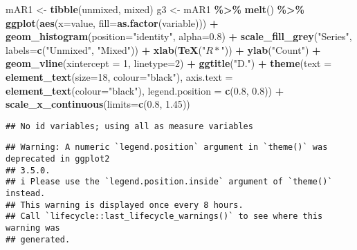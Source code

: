 \documentclass[
]{article}
\newenvironment{Shaded}{\begin{snugshade}}{\end{snugshade}}
\newcommand{\AttributeTok}[1]{\textcolor[rgb]{0.13,0.29,0.53}{#1}}
\newcommand{\DecValTok}[1]{\textcolor[rgb]{0.00,0.00,0.81}{#1}}
\newcommand{\FloatTok}[1]{\textcolor[rgb]{0.00,0.00,0.81}{#1}}
\newcommand{\FunctionTok}[1]{\textcolor[rgb]{0.13,0.29,0.53}{\textbf{#1}}}
\newcommand{\NormalTok}[1]{#1}
\newcommand{\OtherTok}[1]{\textcolor[rgb]{0.56,0.35,0.01}{#1}}
\newcommand{\SpecialCharTok}[1]{\textcolor[rgb]{0.81,0.36,0.00}{\textbf{#1}}}
\newcommand{\StringTok}[1]{\textcolor[rgb]{0.31,0.60,0.02}{#1}}
\begin{document}
\begin{Shaded}
\begin{Highlighting}[]
\NormalTok{mAR1 }\OtherTok{\textless{}{-}} \FunctionTok{tibble}\NormalTok{(unmixed, mixed)}
\NormalTok{g3 }\OtherTok{\textless{}{-}} 
\NormalTok{  mAR1 }\SpecialCharTok{\%\textgreater{}\%} 
  \FunctionTok{melt}\NormalTok{() }\SpecialCharTok{\%\textgreater{}\%} 
  \FunctionTok{ggplot}\NormalTok{(}\FunctionTok{aes}\NormalTok{(}\AttributeTok{x=}\NormalTok{value, }\AttributeTok{fill=}\FunctionTok{as.factor}\NormalTok{(variable))) }\SpecialCharTok{+}
  \FunctionTok{geom\_histogram}\NormalTok{(}\AttributeTok{position=}\StringTok{"identity"}\NormalTok{, }\AttributeTok{alpha=}\FloatTok{0.8}\NormalTok{) }\SpecialCharTok{+}
  \FunctionTok{scale\_fill\_grey}\NormalTok{(}\StringTok{"Series"}\NormalTok{, }\AttributeTok{labels=}\FunctionTok{c}\NormalTok{(}\StringTok{"Unmixed"}\NormalTok{, }\StringTok{"Mixed"}\NormalTok{)) }\SpecialCharTok{+}
  \FunctionTok{xlab}\NormalTok{(}\FunctionTok{TeX}\NormalTok{(}\StringTok{"$R*$"}\NormalTok{)) }\SpecialCharTok{+}
  \FunctionTok{ylab}\NormalTok{(}\StringTok{"Count"}\NormalTok{) }\SpecialCharTok{+}
  \FunctionTok{geom\_vline}\NormalTok{(}\AttributeTok{xintercept =} \DecValTok{1}\NormalTok{, }\AttributeTok{linetype=}\DecValTok{2}\NormalTok{) }\SpecialCharTok{+}
  \FunctionTok{ggtitle}\NormalTok{(}\StringTok{"D."}\NormalTok{) }\SpecialCharTok{+}
  \FunctionTok{theme}\NormalTok{(}\AttributeTok{text =} \FunctionTok{element\_text}\NormalTok{(}\AttributeTok{size=}\DecValTok{18}\NormalTok{, }\AttributeTok{colour=}\StringTok{"black"}\NormalTok{),}
        \AttributeTok{axis.text =} \FunctionTok{element\_text}\NormalTok{(}\AttributeTok{colour=}\StringTok{"black"}\NormalTok{),}
        \AttributeTok{legend.position =} \FunctionTok{c}\NormalTok{(}\FloatTok{0.8}\NormalTok{, }\FloatTok{0.8}\NormalTok{)) }\SpecialCharTok{+}
  \FunctionTok{scale\_x\_continuous}\NormalTok{(}\AttributeTok{limits=}\FunctionTok{c}\NormalTok{(}\FloatTok{0.8}\NormalTok{, }\FloatTok{1.45}\NormalTok{))}
\end{Highlighting}
\end{Shaded}

\begin{verbatim}
## No id variables; using all as measure variables
\end{verbatim}

\begin{verbatim}
## Warning: A numeric `legend.position` argument in `theme()` was deprecated in ggplot2
## 3.5.0.
## i Please use the `legend.position.inside` argument of `theme()` instead.
## This warning is displayed once every 8 hours.
## Call `lifecycle::last_lifecycle_warnings()` to see where this warning was
## generated.
\end{verbatim}
\end{document}
